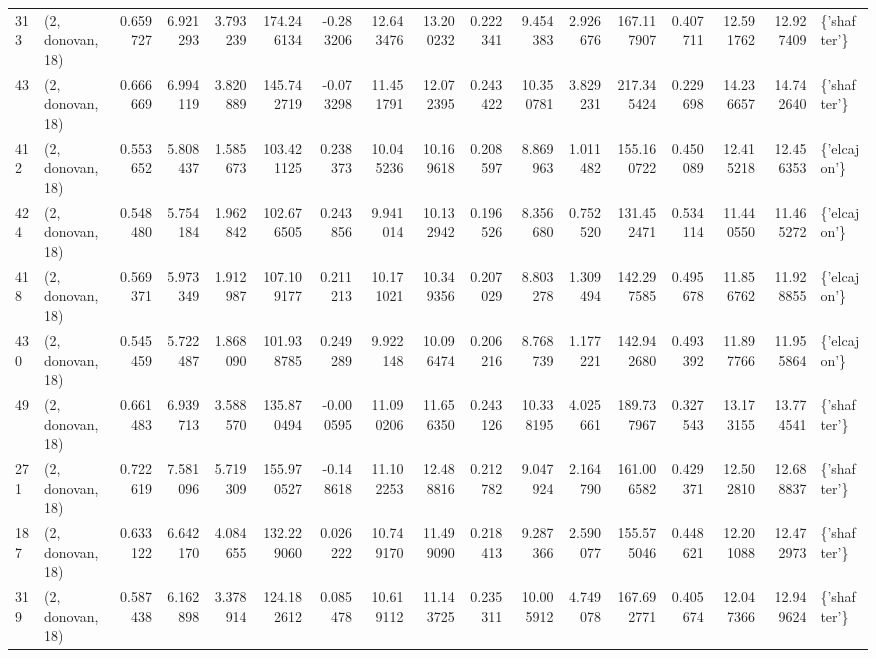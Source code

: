 \begin{tabular}{llrrrrrrrrrrrrrrl}
313 &  (2, donovan, 18) &   0.659727 &   6.921293 &   3.793239 &   174.246134 &  -0.283206 &  12.643476 &  13.200232 &  0.222341 &   9.454383 &   2.926676 &   167.117907 &   0.407711 &  12.591762 &  12.927409 &  \{'shafter'\} \\
43  &  (2, donovan, 18) &   0.666669 &   6.994119 &   3.820889 &   145.742719 &  -0.073298 &  11.451791 &  12.072395 &  0.243422 &  10.350781 &   3.829231 &   217.345424 &   0.229698 &  14.236657 &  14.742640 &  \{'shafter'\} \\
412 &  (2, donovan, 18) &   0.553652 &   5.808437 &   1.585673 &   103.421125 &   0.238373 &  10.045236 &  10.169618 &  0.208597 &   8.869963 &   1.011482 &   155.160722 &   0.450089 &  12.415218 &  12.456353 &  \{'elcajon'\} \\
424 &  (2, donovan, 18) &   0.548480 &   5.754184 &   1.962842 &   102.676505 &   0.243856 &   9.941014 &  10.132942 &  0.196526 &   8.356680 &   0.752520 &   131.452471 &   0.534114 &  11.440550 &  11.465272 &  \{'elcajon'\} \\
418 &  (2, donovan, 18) &   0.569371 &   5.973349 &   1.912987 &   107.109177 &   0.211213 &  10.171021 &  10.349356 &  0.207029 &   8.803278 &   1.309494 &   142.297585 &   0.495678 &  11.856762 &  11.928855 &  \{'elcajon'\} \\
430 &  (2, donovan, 18) &   0.545459 &   5.722487 &   1.868090 &   101.938785 &   0.249289 &   9.922148 &  10.096474 &  0.206216 &   8.768739 &   1.177221 &   142.942680 &   0.493392 &  11.897766 &  11.955864 &  \{'elcajon'\} \\
49  &  (2, donovan, 18) &   0.661483 &   6.939713 &   3.588570 &   135.870494 &  -0.000595 &  11.090206 &  11.656350 &  0.243126 &  10.338195 &   4.025661 &   189.737967 &   0.327543 &  13.173155 &  13.774541 &  \{'shafter'\} \\
271 &  (2, donovan, 18) &   0.722619 &   7.581096 &   5.719309 &   155.970527 &  -0.148618 &  11.102253 &  12.488816 &  0.212782 &   9.047924 &   2.164790 &   161.006582 &   0.429371 &  12.502810 &  12.688837 &  \{'shafter'\} \\
187 &  (2, donovan, 18) &   0.633122 &   6.642170 &   4.084655 &   132.229060 &   0.026222 &  10.749170 &  11.499090 &  0.218413 &   9.287366 &   2.590077 &   155.575046 &   0.448621 &  12.201088 &  12.472973 &  \{'shafter'\} \\
319 &  (2, donovan, 18) &   0.587438 &   6.162898 &   3.378914 &   124.182612 &   0.085478 &  10.619112 &  11.143725 &  0.235311 &  10.005912 &   4.749078 &   167.692771 &   0.405674 &  12.047366 &  12.949624 &  \{'shafter'\} \\

\end{tabular}
